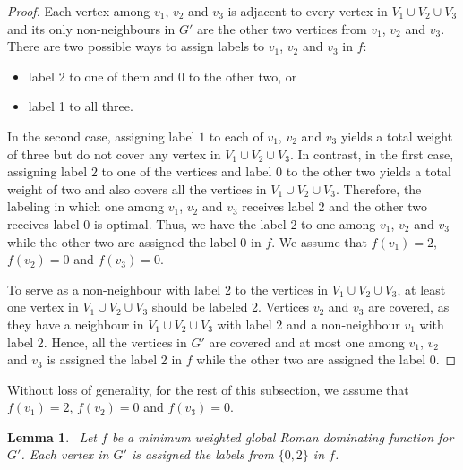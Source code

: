 \documentclass[preprint,12pt]{elsarticle}
\newtheorem{lemma}{Lemma}
\begin{document}
\begin{proof}
        Each vertex among $v_1$, $v_2$ and $v_3$ is adjacent to every vertex in $V_1 \cup V_2 \cup V_3$ and its only non-neighbours in $G'$ are the other two vertices from $v_1$, $v_2$ and $v_3$. There are two possible ways to assign labels to $v_1$, $v_2$ and $v_3$ in $f$:
    \begin{itemize}
        \item label 2 to one of them and 0 to the other two, or
        \item label 1 to all three.
    \end{itemize}

In the second case, assigning label \(1\) to each of \(v_1\), \(v_2\) and \(v_3\) yields a total weight of three but do not cover any vertex in $V_1 \cup V_2 \cup V_3$.  
In contrast, in the first case, assigning label \(2\) to one of the vertices and label \(0\) to the other two yields a total weight of two and also covers all the vertices in $V_1 \cup V_2 \cup V_3$. Therefore, the labeling in which one among \(v_1\), \(v_2\) and $v_3$ receives label \(2\) and the other two receives label \(0\) is optimal. Thus, we have the label 2 to one among $v_1$, $v_2$ and $v_3$ while the other two are assigned the label 0 in $f$. We assume that $f(v_1) = 2$, $f(v_2) = 0$ and $f(v_3) = 0$.

To serve as a non-neighbour with label 2 to the vertices in $V_1 \cup V_2 \cup V_3$, at least one vertex in $V_1 \cup V_2 \cup V_3$ should be labeled 2. Vertices $v_2$ and $v_3$ are covered, as they have a neighbour in $V_1 \cup V_2 \cup V_3$ with label 2 and a non-neighbour $v_1$ with label 2. Hence, all the vertices in $G'$ are covered and at most one among $v_1$,  $v_2$ and $v_3$ is assigned the label 2 in $f$ while the other two are assigned the label 0.
\end{proof}
Without loss of generality, for the rest of this subsection, we assume that $f(v_1) =2$, $f(v_2) = 0$ and $f(v_3) = 0$.
\begin{lemma}~\label{f2}
    Let $f$ be a minimum weighted global Roman dominating function for $G'$. Each vertex in $G'$ is assigned the labels from $\{0, 2\}$ in $f$.
\end{lemma}
\end{document}
